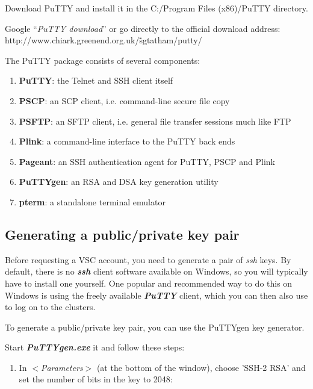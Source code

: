   Download PuTTY and install it in the C:/Program Files (x86)/PuTTY directory.

  Google ``\textit{PuTTY download}'' or go directly to the official download
  address: http://www.chiark.greenend.org.uk/\~sgtatham/putty/

  The PuTTY package consists of several components:

  \begin{enumerate}
    \item  \textbf{PuTTY}: the Telnet and SSH client itself
    \item  \textbf{PSCP}: an SCP client, i.e. command-line secure file copy
    \item  \textbf{PSFTP}: an SFTP client, i.e. general file transfer sessions much like FTP
    \item  \textbf{Plink}: a command-line interface to the PuTTY back ends
    \item  \textbf{Pageant}: an SSH authentication agent for PuTTY, PSCP and Plink
    \item  \textbf{PuTTYgen}: an RSA and DSA key generation utility
    \item  \textbf{pterm}: a standalone terminal emulator
  \end{enumerate}

  \subsection{Generating a public/private key pair}
  \label{subsec:generate-key-pair}

  Before requesting a VSC account, you need to generate a pair of \textit{ssh}
  keys. By default, there is no \textbf{\textit{ssh}} client software available
  on Windows, so you will typically have to install one yourself. One popular and
  recommended way to do this on Windows is using the freely available
  \textbf{\textit{PuTTY}} client, which you can then also use to log on to the
  clusters.

  To generate a public/private key pair, you can use the PuTTYgen key generator.

  Start \textbf{\textit{PuTTYgen.exe}} it and follow these steps:

  \begin{enumerate}
    \item  In $<$\textit{Parameters}$>$ (at the bottom of the window), choose 'SSH-2 RSA' and set the number of bits in the key to 2048:
  \end{enumerate}

